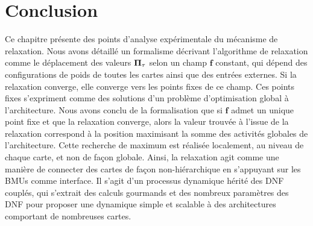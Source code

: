 \documentclass[../main]{subfiles}
\begin{document}

%



\section{Conclusion}

Ce chapitre présente des points d'analyse expérimentale du mécanisme de relaxation. 
Nous avons détaillé un formalisme décrivant l'algorithme de relaxation comme le déplacement des valeurs $\mathbf{\Pi}_\tau$ selon un champ $\mathbf{f}$ constant, qui dépend des configurations de poids de toutes les cartes ainsi que des entrées externes. 
Si la relaxation converge, elle converge vers les points fixes de ce champ. 
Ces points fixes s'expriment comme des solutions d'un problème d'optimisation global à l'architecture.
Nous avons conclu de la formalisation que si $\mathbf{f}$ admet un unique point fixe et que la relaxation converge, alors la valeur trouvée à l'issue de la relaxation correspond à la position maximisant la somme des activités globales de l'architecture.
Cette recherche de maximum est réalisée localement, au niveau de chaque carte, et non de façon globale. Ainsi, la relaxation agit comme une manière de connecter des cartes de façon non-hiérarchique en s'appuyant sur les BMUs comme interface. Il s'agit d'un processus dynamique hérité des DNF couplés, qui s'extrait des calculs gourmands et des nombreux paramètres des DNF pour proposer une dynamique simple et scalable à des architectures comportant de nombreuses cartes.
\end{document}
